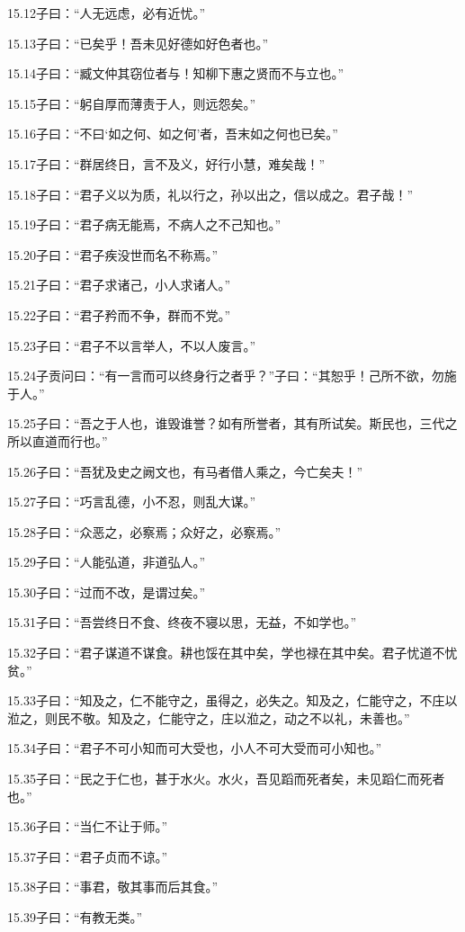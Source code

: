 \documentclass[a4paper,12pt,UTF8,twoside]{ctexbook}
\begin{document}
15.12子曰：“人无远虑，必有近忧。”

15.13子曰：“已矣乎！吾未见好德如好色者也。”

15.14子曰：“臧文仲其窃位者与！知柳下惠之贤而不与立也。”

15.15子曰：“躬自厚而薄责于人，则远怨矣。”

15.16子曰：“不曰‘如之何、如之何’者，吾末如之何也已矣。”

15.17子曰：“群居终日，言不及义，好行小慧，难矣哉！”

15.18子曰：“君子义以为质，礼以行之，孙以出之，信以成之。君子哉！”

15.19子曰：“君子病无能焉，不病人之不己知也。”

15.20子曰：“君子疾没世而名不称焉。”

15.21子曰：“君子求诸己，小人求诸人。”

15.22子曰：“君子矜而不争，群而不党。”

15.23子曰：“君子不以言举人，不以人废言。”

15.24子贡问曰：“有一言而可以终身行之者乎？”子曰：“其恕乎！己所不欲，勿施于人。”

15.25子曰：“吾之于人也，谁毁谁誉？如有所誉者，其有所试矣。斯民也，三代之所以直道而行也。”

15.26子曰：“吾犹及史之阙文也，有马者借人乘之，今亡矣夫！”

15.27子曰：“巧言乱德，小不忍，则乱大谋。”

15.28子曰：“众恶之，必察焉；众好之，必察焉。”

15.29子曰：“人能弘道，非道弘人。”

15.30子曰：“过而不改，是谓过矣。”

15.31子曰：“吾尝终日不食、终夜不寝以思，无益，不如学也。”

15.32子曰：“君子谋道不谋食。耕也馁在其中矣，学也禄在其中矣。君子忧道不忧贫。”

15.33子曰：“知及之，仁不能守之，虽得之，必失之。知及之，仁能守之，不庄以涖之，则民不敬。知及之，仁能守之，庄以涖之，动之不以礼，未善也。”

15.34子曰：“君子不可小知而可大受也，小人不可大受而可小知也。”

15.35子曰：“民之于仁也，甚于水火。水火，吾见蹈而死者矣，未见蹈仁而死者也。”

15.36子曰：“当仁不让于师。”

15.37子曰：“君子贞而不谅。”

15.38子曰：“事君，敬其事而后其食。”

15.39子曰：“有教无类。”
\end{document}
